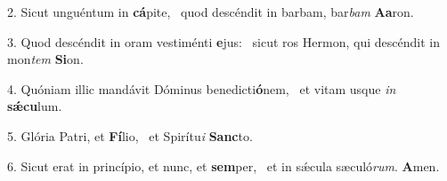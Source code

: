 2. Sicut unguéntum in \textbf{cá}pite, \ast\  quod descéndit in barbam, bar\textit{bam} \textbf{A}\textbf{a}ron.\

3. Quod descéndit in oram vestiménti \textbf{e}jus: \ast\  sicut ros Hermon, qui descéndit in mon\textit{tem} \textbf{Si}on.\

4. Quóniam illic mandávit Dóminus benedicti\textbf{ó}nem, \ast\  et vitam usque \textit{in} \textbf{sǽ}\textbf{cu}lum.\

5. Glória Patri, et \textbf{Fí}lio, \ast\  et Spirítu\textit{i} \textbf{Sanc}to.\

6. Sicut erat in princípio, et nunc, et \textbf{sem}per, \ast\  et in sǽcula sæculó\textit{rum}. \textbf{A}men.\

